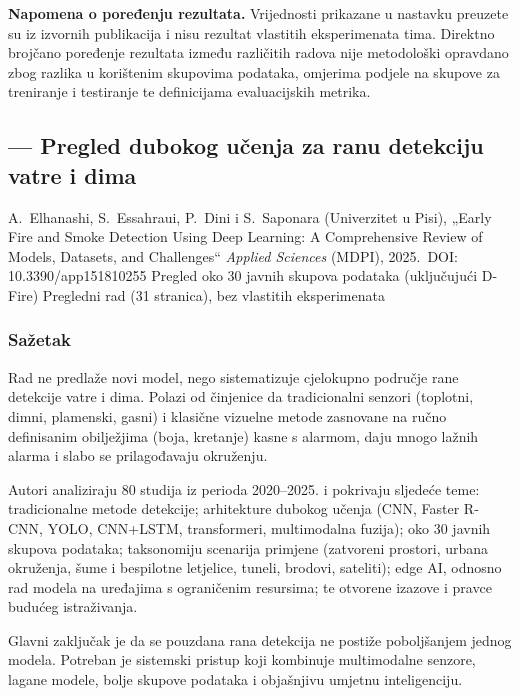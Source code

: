 \textbf{Napomena o poređenju rezultata.} Vrijednosti prikazane u nastavku preuzete su iz izvornih publikacija i nisu rezultat vlastitih eksperimenata tima. Direktno brojčano poređenje rezultata između različitih radova nije metodološki opravdano zbog razlika u korištenim skupovima podataka, omjerima podjele na skupove za treniranje i testiranje te definicijama evaluacijskih metrika.
\clearpage
\subsection{\texorpdfstring{\AutorA}{Ime Prezime} --- Pregled dubokog učenja za ranu detekciju vatre i dima}

\paperbox{\AutorA}
  {A.\ Elhanashi, S.\ Essahraui, P.\ Dini i S.\ Saponara (Univerzitet u Pisi), „Early Fire and Smoke Detection Using Deep Learning: A Comprehensive Review of Models, Datasets, and Challenges“ \cite{elhanashi}}
  {\emph{Applied Sciences} (MDPI), 2025.\ DOI: 10.3390/app151810255}
  {Pregled oko 30 javnih skupova podataka (uključujući D-Fire)}
  {Pregledni rad (31 stranica), bez vlastitih eksperimenata}

\subsubsection{Sažetak}
Rad ne predlaže novi model, nego sistematizuje cjelokupno područje rane detekcije vatre i dima. Polazi od činjenice da tradicionalni senzori (toplotni, dimni, plamenski, gasni) i klasične vizuelne metode zasnovane na ručno definisanim obilježjima (boja, kretanje) kasne s alarmom, daju mnogo lažnih alarma i slabo se prilagođavaju okruženju.

Autori analiziraju 80 studija iz perioda 2020--2025. i pokrivaju sljedeće teme: tradicionalne metode detekcije; arhitekture dubokog učenja (CNN, Faster R-CNN, YOLO, CNN+LSTM, transformeri, multimodalna fuzija); oko 30 javnih skupova podataka; taksonomiju scenarija primjene (zatvoreni prostori, urbana okruženja, šume i bespilotne letjelice, tuneli, brodovi, sateliti); edge AI, odnosno rad modela na uređajima s ograničenim resursima; te otvorene izazove i pravce budućeg istraživanja.

Glavni zaključak je da se pouzdana rana detekcija ne postiže poboljšanjem jednog modela. Potreban je sistemski pristup koji kombinuje multimodalne senzore, lagane modele, bolje skupove podataka i objašnjivu umjetnu inteligenciju.

